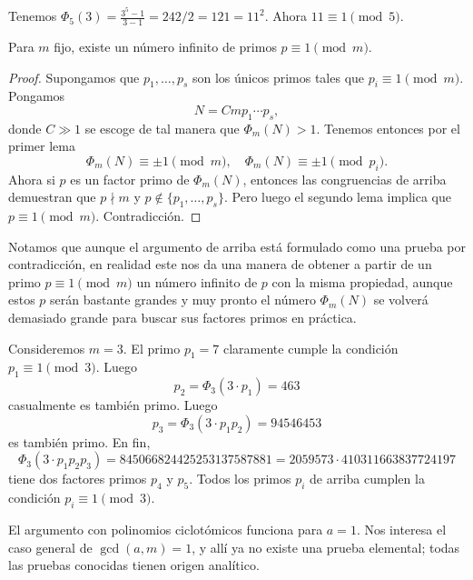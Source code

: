\begin{ejemplo}
  Tenemos $\Phi_5 (3) = \frac{3^5 - 1}{3 - 1} = 242/2 = 121 = 11^2$.
  Ahora $11 \equiv 1 \pmod{5}$.
\end{ejemplo}

\begin{teorema}
  Para $m$ fijo, existe un número infinito de primos $p \equiv 1 \pmod{m}$.

  \begin{proof}
    Supongamos que $p_1,\ldots,p_s$ son los únicos primos tales que
    $p_i\equiv 1 \pmod{m}$. Pongamos
    $$N = C m p_1\cdots p_s,$$
    donde $C \gg 1$ se escoge de tal manera que $\Phi_m (N) > 1$.
    Tenemos entonces por el primer lema
    $$\Phi_m (N) \equiv \pm 1 \pmod{m}, \quad \Phi_m (N) \equiv \pm 1 \pmod{p_i}.$$
    Ahora si $p$ es un factor primo de $\Phi_m (N)$, entonces las congruencias
    de arriba demuestran que $p \nmid m$ y $p \notin \{ p_1, \ldots, p_s \}$.
    Pero luego el segundo lema implica que $p \equiv 1 \pmod{m}$. Contradicción.
  \end{proof}
\end{teorema}

Notamos que aunque el argumento de arriba está formulado como una prueba por
contradicción, en realidad este nos da una manera de obtener a partir de un
primo $p \equiv 1 \pmod{m}$ un número infinito de $p$ con la misma propiedad,
aunque estos $p$ serán bastante grandes y muy pronto el número $\Phi_m (N)$
se volverá demasiado grande para buscar sus factores primos en práctica.

\begin{ejemplo}
  Consideremos $m = 3$. El primo $p_1 = 7$ claramente cumple la condición
  $p_1 \equiv 1 \pmod{3}$. Luego
  $$p_2 = \Phi_3 (3\cdot p_1) = 463$$
  casualmente es también primo. Luego
  $$p_3 = \Phi_3 (3\cdot p_1 p_2) = 94546453$$
  es también primo. En fin,
  $$\Phi_3 (3\cdot p_1 p_2 p_3) = 845066824425253137587881 = 2059573\cdot 410311663837724197$$
  tiene dos factores primos $p_4$ y $p_5$. Todos los primos $p_i$ de arriba
  cumplen la condición $p_i \equiv 1 \pmod{3}$.
\end{ejemplo}

El argumento con polinomios ciclotómicos funciona para $a = 1$. Nos interesa
el caso general de $\gcd (a,m)=1$, y allí ya no existe una prueba elemental;
todas las pruebas conocidas tienen origen analítico.


